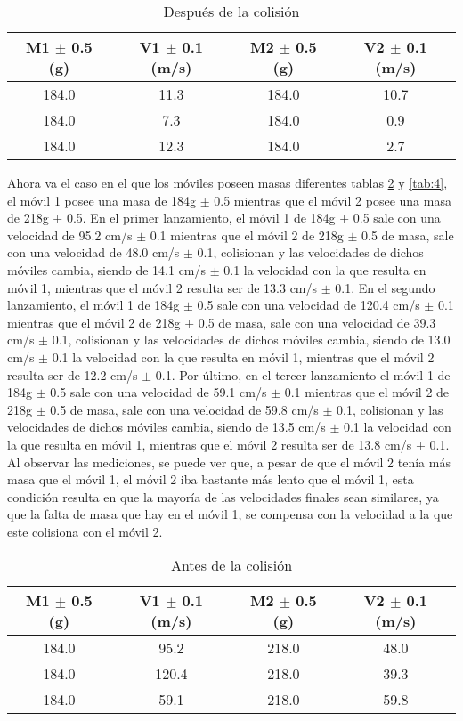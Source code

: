 \documentclass{article}
\begin{document}
\begin{table}[H]
	\centering	
	\begin{tabular}{|c|c|c|c|}
\hline
M1 $\pm$ 0.5 (g) & V1 $\pm$ 0.1 (m/s) & M2 $\pm$ 0.5 (g) & V2 $\pm$ 0.1 (m/s) \\
\hline
184.0 & 11.3 & 184.0 & 10.7 \\
\hline
184.0 & 7.3 & 184.0 & 0.9 \\
\hline
184.0 & 12.3 & 184.0 & 2.7 \\
\hline
\end{tabular}
\caption{Después de la colisión}
\label{tab:2}
\end{table}

Ahora va el caso en el que los móviles poseen masas diferentes tablas \ref{tab:3} y \ref{tab:4}, el móvil 1 posee una masa de 184g $\pm$ 0.5 mientras que el móvil 2 posee una masa de 218g $\pm$ 0.5. En el primer lanzamiento, el móvil 1 de 184g $\pm$ 0.5 sale con una velocidad de 95.2 cm/s $\pm$ 0.1 mientras que el móvil 2 de 218g $\pm$ 0.5 de masa, sale con una velocidad de 48.0 cm/s $\pm$ 0.1, colisionan y las velocidades de dichos móviles cambia, siendo de 14.1 cm/s $\pm$ 0.1 la velocidad con la que resulta en móvil 1, mientras que el móvil 2 resulta ser de 13.3 cm/s $\pm$ 0.1. En el segundo lanzamiento, el móvil 1 de 184g $\pm$ 0.5 sale con una velocidad de 120.4 cm/s $\pm$ 0.1 mientras que el móvil 2 de 218g $\pm$ 0.5 de masa, sale con una velocidad de 39.3 cm/s $\pm$ 0.1, colisionan y las velocidades de dichos móviles cambia, siendo de 13.0 cm/s $\pm$ 0.1 la velocidad con la que resulta en móvil 1, mientras que el móvil 2 resulta ser de 12.2 cm/s $\pm$ 0.1. Por último, en el tercer lanzamiento el móvil 1 de 184g $\pm$ 0.5 sale con una velocidad de 59.1 cm/s $\pm$ 0.1 mientras que el móvil 2 de 218g $\pm$ 0.5 de masa, sale con una velocidad de 59.8 cm/s $\pm$ 0.1, colisionan y las velocidades de dichos móviles cambia, siendo de 13.5 cm/s $\pm$ 0.1 la velocidad con la que resulta en móvil 1, mientras que el móvil 2 resulta ser de 13.8 cm/s $\pm$ 0.1. Al observar las mediciones, se puede ver que, a pesar de que el móvil 2 tenía más masa que el móvil 1, el móvil 2 iba bastante más lento que el móvil 1, esta condición resulta en que la mayoría de las velocidades finales sean similares, ya que la falta de masa que hay en el móvil 1, se compensa con la velocidad a la que este colisiona con el móvil 2.

\begin{table}[H]
	\centering	
	\begin{tabular}{|c|c|c|c|}
\hline
M1 $\pm$ 0.5 (g) & V1 $\pm$ 0.1 (m/s) & M2 $\pm$ 0.5 (g) & V2 $\pm$ 0.1 (m/s) \\
\hline
184.0 & 95.2 & 218.0 & 48.0 \\
\hline
184.0 & 120.4 & 218.0 & 39.3 \\
\hline
184.0 & 59.1 & 218.0 & 59.8 \\
\hline
\end{tabular}
\caption{Antes de la colisión}
\label{tab:3}
\end{table}
\end{document}
